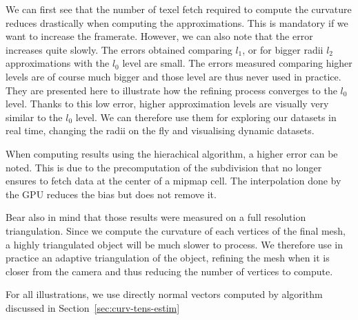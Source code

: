 \documentclass{llncs}
\begin{document}
We can first see that the number of texel fetch required to compute
the curvature reduces drastically when computing the approximations.
This is mandatory if we want to increase the framerate.
However, we can also note that the error increases quite slowly.
The errors obtained comparing $l_1$, or for bigger radii $l_2$ approximations
with the $l_0$ level are small. The errors measured comparing higher levels
are of course much bigger and those level are thus never used in practice.
They are presented here to illustrate how the refining process converges to
the $l_0$ level.
Thanks to this low error, higher approximation levels are visually
very similar to the $l_0$ level. We can therefore use them for exploring our
datasets in real time, changing the radii on the fly and visualising dynamic datasets.

When computing results using the hierachical algorithm, a higher error can be noted.
This is due to the precomputation of the subdivision that no longer ensures to fetch data
at the center of a mipmap cell. The interpolation done by the GPU reduces the bias but
does not remove it.

Bear also in mind that those results were measured on a full resolution triangulation.
Since we compute the curvature of each vertices of the final mesh, a highly triangulated object will
be much slower to process.
We therefore use in practice an adaptive triangulation of the object, refining the mesh
when it is closer from the camera and thus reducing the number of vertices to compute.

For all illustrations, we use directly normal vectors computed by algorithm
discussed in Section~\ref{sec:curv-tens-estim}
\end{document}

